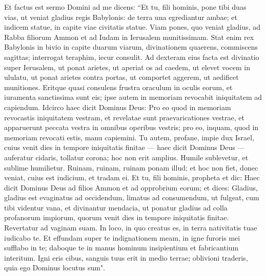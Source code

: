 \begin{biblechapter}
\verse Et factus est sermo Domini ad me dicens: 
\verse “Et tu, fili hominis, pone tibi duas vias, ut veniat gladius regis Babylonis: de terra una egrediantur ambae; et indicem statue, in capite viae civitatis statue. 
\verse Viam pones, quo veniat gladius, ad Rabba filiorum Ammon et ad Iudam in Ierusalem munitissimam. 
\verse Stat enim rex Babylonis in bivio in capite duarum viarum, divinationem quaerens, commiscens sagittas; interrogat teraphim, iecur consulit.  
\verse Ad dexteram eius facta est divinatio super Ierusalem, ut ponat arietes, ut aperiat os ad caedem, ut elevet vocem in ululatu, ut ponat arietes contra portas, ut comportet aggerem, ut aedificet munitiones. 
\verse Eritque quasi consulens frustra oraculum in oculis eorum, et iuramenta sanctissima sunt eis; ipse autem in memoriam revocabit iniquitatem ad capiendum. 
\verse Idcirco haec dicit Dominus Deus: Pro eo quod in memoriam revocastis iniquitatem vestram, et revelatae sunt praevaricationes vestrae, et apparuerunt peccata vestra in omnibus operibus vestris; pro eo, inquam, quod in memoriam revocati estis, manu capiemini. 
\verse Tu autem, profane, impie dux Israel, cuius venit dies in tempore iniquitatis finitae — 
\verse haec dicit Dominus Deus — auferatur cidaris, tollatur corona; hoc non erit amplius. Humile sublevetur, et sublime humilietur. 
\verse Ruinam, ruinam, ruinam ponam illud; et hoc non fiet, donec veniat, cuius est iudicium, et tradam ei. 
\verse Et tu, fili hominis, propheta et dic: Haec dicit Dominus Deus ad filios Ammon et ad opprobrium eorum; et dices: Gladius, gladius est evaginatus ad occidendum, limatus ad consumendum, ut fulgeat, 
\verse cum tibi videntur vana, et divinantur mendacia, ut ponatur gladius ad colla profanorum impiorum, quorum venit dies in tempore iniquitatis finitae. 
\verse Revertatur ad vaginam suam. In loco, in quo creatus es, in terra nativitatis tuae iudicabo te. 
\verse Et effundam super te indignationem meam, in igne furoris mei sufflabo in te; daboque te in manus hominum insipientium et fabricantium interitum. 
\verse Igni eris cibus, sanguis tuus erit in medio terrae; oblivioni traderis, quia ego Dominus locutus sum". 
\end{biblechapter}

